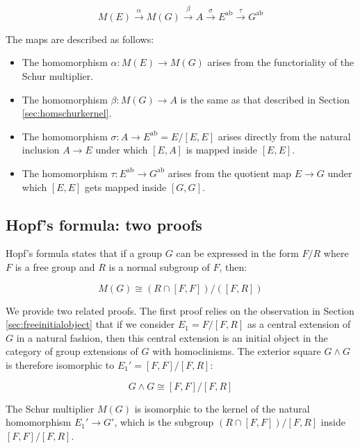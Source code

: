 $$M(E) \stackrel{\alpha}{\to} M(G) \stackrel{\beta}{\to} A \stackrel{\sigma}{\to} E^{\operatorname{ab}} \stackrel{\tau}{\to} G^{\operatorname{ab}}$$

The maps are described as follows:

\begin{itemize}
\item The homomorphism $\alpha:M(E) \to M(G)$ arises from the
  functoriality of the Schur multiplier.
\item The homomorphism $\beta:M(G) \to A$ is the same as that
  described in Section \ref{sec:homschurkernel}.
\item The homomorphism $\sigma:A \to E^{\operatorname{ab}} = E/[E,E]$
  arises directly from the natural inclusion $A \to E$ under which
  $[E,A]$ is mapped inside $[E,E]$.
\item The homomorphism $\tau:E^{\operatorname{ab}} \to
  G^{\operatorname{ab}}$ arises from the quotient map $E \to G$ under
  which $[E,E]$ gets mapped inside $[G,G]$.
\end{itemize}

\subsection{Hopf's formula: two proofs}\label{sec:hopf-formula-proofs}

Hopf's formula states that if a group $G$ can be expressed in the form
$F/R$ where $F$ is a free group and $R$ is a normal subgroup of $F$, then:

\begin{equation}\label{eq:hopf-formula}
  M(G) \cong (R \cap [F,F])/([F,R])
\end{equation}

We provide two related proofs. The first proof relies on the
observation in Section \ref{sec:freeinitialobject}
that if we consider $E_1 = F/[F,R]$ as a central extension of $G$ in a
natural fashion, then this central extension is an initial object in
the category of group extensions of $G$ with homoclinisms. The
exterior square $G \wedge G$ is therefore isomorphic to $E_1' =
[F,F]/[F,R]$:

\begin{equation}\label{eq:exteriorsquare-hopf-formula}
  G \wedge G \cong [F,F]/[F,R]
\end{equation}

The Schur multiplier $M(G)$ is isomorphic to the kernel of the natural
homomorphism $E_1' \to G'$, which is the subgroup $(R \cap
[F,F])/[F,R]$ inside $[F,F]/[F,R]$.

